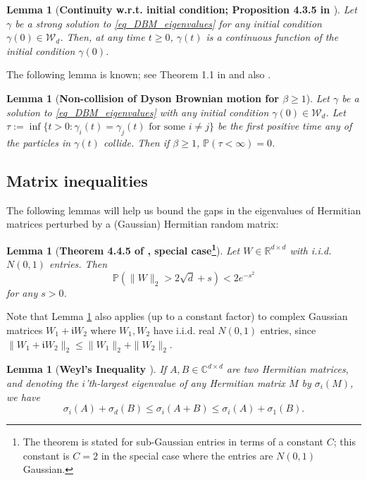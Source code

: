 \documentclass[11pt,letterpaper]{article}
\newtheorem{lemma}[theorem]{Lemma}
\begin{document}
%
\begin{lemma}[\bf Continuity w.r.t. initial condition; Proposition 4.3.5 in \cite{anderson2010introduction}]\label{lemma_continuity} 
Let $\gamma$ be a strong solution to \eqref{eq_DBM_eigenvalues} for any initial condition $\gamma(0)\in \mathcal{W}_d$. 
%
Then, at any time $t\geq 0$, $\gamma(t)$ is a continuous function of the initial condition $\gamma(0)$.
\end{lemma}
%
\noindent
The following lemma is known; see Theorem 1.1 in \cite{inukai2006collision} and also \cite{rogers1993interacting}.
%
\begin{lemma}[\bf Non-collision of Dyson Brownian motion for $\beta \geq 1$] \label{lemma_DBM_collision}
%
Let $\gamma$ be a solution to \eqref{eq_DBM_eigenvalues} with any initial condition $\gamma(0) \in \mathcal{W}_d$.
%
Let $\tau := \inf \{t>0: \gamma_i(t) = \gamma_j(t) \textrm{ for some } i\neq j\}$ be the first positive time any of the particles in  $\gamma(t)$ collide.
%
Then if $\beta \geq 1$, $\mathbb{P}(\tau <\infty) = 0$.
%
\end{lemma}

\subsection{Matrix inequalities}

The following  lemmas will help us bound the gaps in the eigenvalues of Hermitian matrices perturbed by a (Gaussian) Hermitian random matrix: %

\begin{lemma} [\bf Theorem 4.4.5 of \cite{vershynin2018high}, special case\footnote{The theorem is stated for sub-Gaussian entries in terms of a constant $C$; this constant is $C=2$ in the special case where the entries are $N(0,1)$ Gaussian.}] \label{lemma_concentration} 
Let $W \in \mathbb{R}^{d \times d}$ with i.i.d. $N(0,1)$ entries. Then 
%
\begin{equation*}
    \mathbb{P}(\|W\|_2 > 2\sqrt{d} +s) <  2e^{-s^2}
\end{equation*}
 for any $s>0$.
\end{lemma}
%
\noindent
Note that Lemma \ref{lemma_concentration} also applies (up to a constant factor) to complex Gaussian matrices $W_1 + \mathfrak{i}W_2$ where $W_1, W_2$ have i.i.d. real $N(0,1)$ entries, since $\|W_1 + \mathfrak{i}W_2\|_2 \leq \|W_1\|_2 + \|W_2\|_2$.



\begin{lemma}[\bf Weyl's Inequality \cite{bhatia2013matrix}]\label{lemma_weyl}
If $A,B \in \mathbb{C}^{d\times d}$ are two Hermitian matrices, and denoting the $i$'th-largest eigenvalue of any Hermitian matrix $M$ by $\sigma_i(M)$, we have
%
\begin{equation*}
 \sigma_i(A) + \sigma_d(B) \leq  \sigma_i(A + B) \leq  \sigma_i(A) + \sigma_1(B).
\end{equation*}
\end{lemma}
\end{document}
